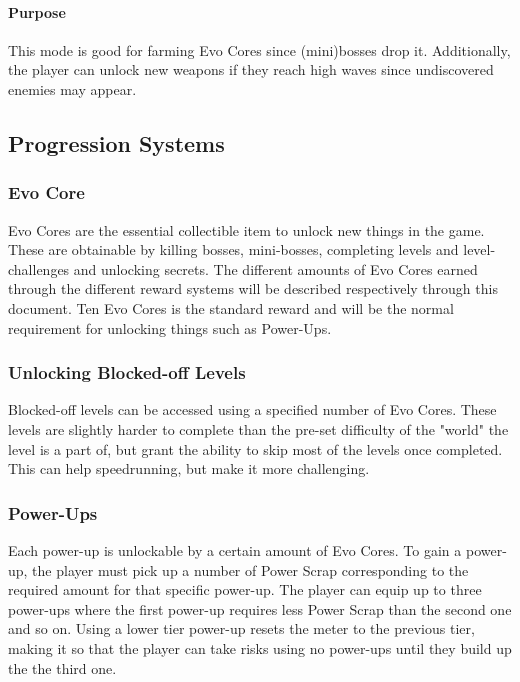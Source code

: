 \documentclass[12pt]{article}
\begin{document}
\paragraph{Purpose}

This mode is good for farming Evo Cores since (mini)bosses drop it. Additionally, the player can unlock new weapons if they reach high waves since undiscovered enemies may appear.

\subsection{Progression Systems}

\subsubsection{Evo Core}

Evo Cores are the essential collectible item to unlock new things in the game. These are obtainable by killing bosses, mini-bosses, completing levels and level-challenges and unlocking secrets. The different amounts of Evo Cores earned through the different reward systems will be described respectively through this document. Ten Evo Cores is the standard reward and will be the normal requirement for unlocking things such as Power-Ups. 

\subsubsection{Unlocking Blocked-off Levels}

Blocked-off levels can be accessed using a specified number of Evo Cores. These levels are slightly harder to complete than the pre-set difficulty of the "world" the level is a part of, but grant the ability to skip most of the levels once completed. This can help speedrunning, but make it more challenging. 

\subsubsection{Power-Ups}

Each power-up is unlockable by a certain amount of Evo Cores. To gain a power-up, the player must pick up a number of Power Scrap corresponding to the required amount for that specific power-up. The player can equip up to three power-ups where the first power-up requires less Power Scrap than the second one and so on. Using a lower tier power-up resets the meter to the previous tier, making it so that the player can take risks using no power-ups until they build up the the third one.
\end{document}
